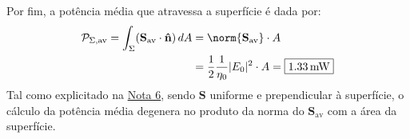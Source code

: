 \begin{question}
    Por fim, a potência média que atravessa a superfície é dada por:
    $$
        \begin{aligned}
             \mathcal{P}_{\Sigma, \text{av}} = \int_{\Sigma} (\mathbf{S}_\text{av}\cdot\mathbf{\Hat{n}}) \, dA &= \norm{\mathbf{S}_\text{av}} \cdot A\\
             &= \frac{1}{2} \frac{1}{\eta_0}|E_0|^2\cdot A = \boxed{1.33\, \text{mW}}
        \end{aligned}
    $$
    Tal como explicitado na \hyperref[warn:6]{Nota 6}, sendo $\mathbf{S}$ uniforme e prependicular à superfície, o cálculo da potência média degenera no produto da norma do $\mathbf{S}_\text{av}$ com a área da superfície.
\end{question}%




